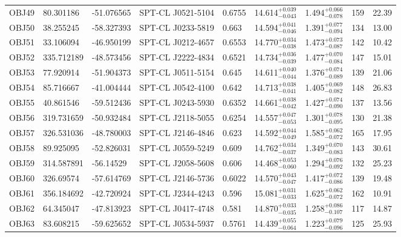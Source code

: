 \documentclass[apj,twocolumn]{emulateapj}
\begin{document}
{\begin{table}[h!]
\begin{tabular}{l l l l l c c c c}
 OBJ49 & 80.301186  & -51.076565 &  SPT-CL J0521-5104      & 0.6755 & 14.614$^{+0.039}_{-0.043}$ & 1.494$^{+0.066}_{-0.078}$ &   159 & 22.39 \\
 OBJ50 & 38.255245  & -58.327393 &  SPT-CL J0233-5819      & 0.663  & 14.594$^{+0.041}_{-0.046}$ & 1.391$^{+0.077}_{-0.094}$ &   134 & 13.00 \\
 OBJ51 & 33.106094  & -46.950199 &  SPT-CL J0212-4657      & 0.6553 & 14.770$^{+0.034}_{-0.038}$ & 1.473$^{+0.073}_{-0.087}$ &   142 & 10.42 \\
 OBJ52 & 335.712189 & -48.573456 &  SPT-CL J2222-4834      & 0.6521 & 14.734$^{+0.036}_{-0.039}$ & 1.477$^{+0.070}_{-0.084}$ &   147 & 15.01 \\
 OBJ53 & 77.920914  & -51.904373 &  SPT-CL J0511-5154      & 0.645  & 14.611$^{+0.040}_{-0.044}$ & 1.376$^{+0.074}_{-0.089}$ &   139 & 21.06 \\
 OBJ54 & 85.716667  & -41.004444 &  SPT-CL J0542-4100      & 0.642  & 14.713$^{+0.038}_{-0.041}$ & 1.405$^{+0.069}_{-0.082}$ &   148 & 26.83 \\
 OBJ55 & 40.861546  & -59.512436 &  SPT-CL J0243-5930      & 0.6352 & 14.661$^{+0.038}_{-0.042}$ & 1.427$^{+0.074}_{-0.090}$ &   137 & 13.56 \\
 OBJ56 & 319.731659 & -50.932484 &  SPT-CL J2118-5055      & 0.6254 & 14.557$^{+0.047}_{-0.053}$ & 1.301$^{+0.078}_{-0.095}$ &   130 & 21.38 \\
 OBJ57 & 326.531036 & -48.780003 &  SPT-CL J2146-4846      & 0.623  & 14.592$^{+0.044}_{-0.049}$ & 1.585$^{+0.062}_{-0.072}$ &   165 & 17.95 \\
 OBJ58 & 89.925095  & -52.826031 &  SPT-CL J0559-5249      & 0.609  & 14.762$^{+0.034}_{-0.037}$ & 1.349$^{+0.070}_{-0.083}$ &   143 & 30.61 \\
 OBJ59 & 314.587891 & -56.14529  &  SPT-CL J2058-5608      & 0.606  & 14.468$^{+0.053}_{-0.060}$ & 1.294$^{+0.076}_{-0.092}$ &   132 & 25.23 \\
 OBJ60 & 326.69574  & -57.614769 &  SPT-CL J2146-5736      & 0.6022 & 14.570$^{+0.043}_{-0.047}$ & 1.417$^{+0.072}_{-0.086}$ &   139 & 19.48 \\
 OBJ61 & 356.184692 & -42.720924 &  SPT-CL J2344-4243      & 0.596  & 15.081$^{+0.031}_{-0.033}$ & 1.625$^{+0.062}_{-0.072}$ &   162 & 10.91 \\
 OBJ62 & 64.345047  & -47.813923 &  SPT-CL J0417-4748      & 0.581  & 14.870$^{+0.033}_{-0.035}$ & 1.258$^{+0.086}_{-0.107}$ &   117 & 14.87 \\
 OBJ63 & 83.608215  & -59.625652 &  SPT-CL J0534-5937      & 0.5761 & 14.439$^{+0.055}_{-0.064}$ & 1.223$^{+0.079}_{-0.096}$ &   125 & 25.93 \\

\end{tabular}
\end{table}}
\end{document}
